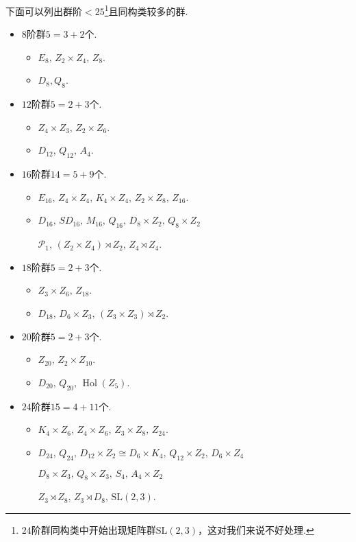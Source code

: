 下面可以列出群阶$<25$\footnote{$24$阶群同构类中开始出现矩阵群$\mathrm{SL}(2,3)$，这对我们来说不好处理.}且同构类较多的群.
\begin{itemize}
	\item $8$阶群$5=3+2$个.\begin{itemize}
		\item $E_8,\,Z_2\times Z_4,\,Z_8$.
		\item $D_8,Q_8$.
	\end{itemize}
	\item $12$阶群$5=2+3$个.\begin{itemize}
		\item $Z_4\times Z_3,\,Z_2\times Z_6$.
		\item $D_{12},\,Q_{12},\,A_4$.
	\end{itemize}
	\item $16$阶群$14=5+9$个.\begin{itemize}
		\item $E_{16},\,Z_4\times Z_4,\,K_4\times Z_4,\,Z_2\times Z_8,\,Z_{16}$.
		\item $D_{16},\,SD_{16},\,M_{16},\,Q_{16},\,D_8\times Z_2,\,Q_8\times Z_2$\par $\mathcal{P}_1,\,(Z_2\times Z_4)\rtimes Z_2,\, Z_4\rtimes Z_4$.
	\end{itemize}
	\item $18$阶群$5=2+3$个.\begin{itemize}
		\item $Z_3\times Z_6,\,Z_{18}$.
		\item $D_{18},\,D_6\times Z_3,\,(Z_3\times Z_3)\rtimes Z_2$.
	\end{itemize}
	\item $20$阶群$5=2+3$个.\begin{itemize}
		\item $Z_{20},\,Z_2\times Z_{10}$.
		\item $D_{20},\,Q_{20},\,\operatorname*{Hol}(Z_5)$.
	\end{itemize}
	\item[{\color{red}\textbullet}] $24$阶群$15=4+11$个.\begin{itemize}
		\item $K_4\times Z_6,\,Z_4\times Z_6,\,Z_3\times Z_8,\,Z_{24}$.
		\item $D_{24},\,Q_{24},\,D_{12}\times Z_2\cong D_6\times K_4,\,Q_{12}\times Z_2,\,D_6\times Z_4$\par $D_8\times Z_3,\,Q_8\times Z_3,\,S_4,\,A_4\times Z_2$\par $Z_3\rtimes Z_8,\,Z_3\rtimes D_8,\,\mathrm{SL}(2,3)$.
	\end{itemize}
\end{itemize}
